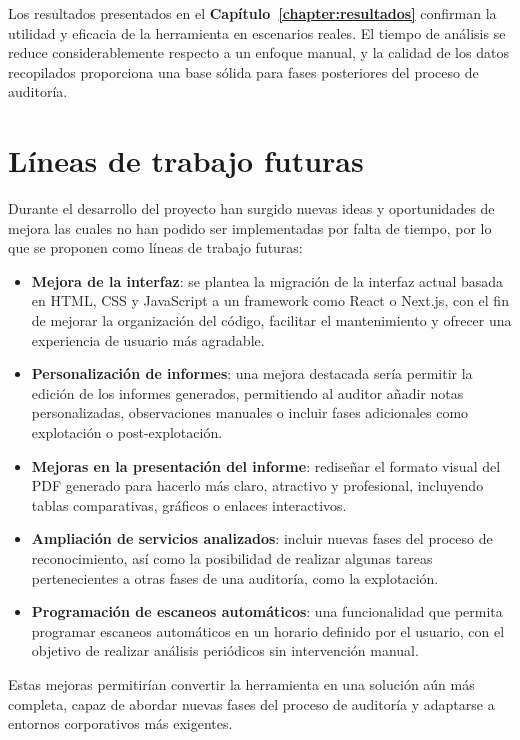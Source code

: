 \begin{parskipenv}
Los resultados presentados en el \textbf{Capítulo~\ref{chapter:resultados}} confirman la utilidad y eficacia de la herramienta en escenarios reales. El tiempo de análisis se reduce considerablemente respecto a un enfoque manual, y la calidad de los datos recopilados proporciona una base sólida para fases posteriores del proceso de auditoría.

\section{Líneas de trabajo futuras}
Durante el desarrollo del proyecto han surgido nuevas ideas y oportunidades de mejora las cuales no han podido ser implementadas por falta de tiempo, por lo que se proponen como líneas de trabajo futuras:

\begin{itemize}
    \item \textbf{Mejora de la interfaz}: se plantea la migración de la interfaz actual basada en HTML, CSS y JavaScript a un framework como React o Next.js, con el fin de mejorar la organización del código, facilitar el mantenimiento y ofrecer una experiencia de usuario más agradable.
    
    \item \textbf{Personalización de informes}: una mejora destacada sería permitir la edición de los informes generados, permitiendo al auditor añadir notas personalizadas, observaciones manuales o incluir fases adicionales como explotación o post-explotación.

    \item \textbf{Mejoras en la presentación del informe}: rediseñar el formato visual del PDF generado para hacerlo más claro, atractivo y profesional, incluyendo tablas comparativas, gráficos o enlaces interactivos.

    \item \textbf{Ampliación de servicios analizados}: incluir nuevas fases del proceso de reconocimiento, así como la posibilidad de realizar algunas tareas pertenecientes a otras fases de una auditoría, como la explotación.
    
    \item \textbf{Programación de escaneos automáticos}: una funcionalidad que permita programar escaneos automáticos en un horario definido por el usuario, con el objetivo de realizar análisis periódicos sin intervención manual.
\end{itemize}

Estas mejoras permitirían convertir la herramienta en una solución aún más completa, capaz de abordar nuevas fases del proceso de auditoría y adaptarse a entornos corporativos más exigentes.


\end{parskipenv}
